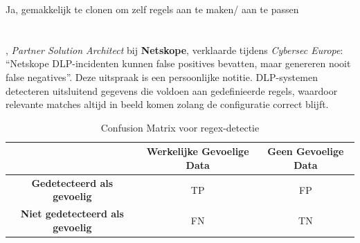 Ja, gemakkelijk te clonen om zelf regels aan te maken/ aan te passen

\section{}
\label{sec:res-eigen-gedefinieerde-dlp-regels}


\subsection{}
\label{sec:functionaliteit-resultaten-eigen}

\subsection{}
\label{sec:correctheid-resultaten-eigen}

\textcite{Quaeyhaegens2025}, \textit{Partner Solution Architect} bij \textbf{Netskope}, verklaarde tijdens \textit{Cybersec Europe}: 
``Netskope DLP-incidenten kunnen false positives bevatten, maar genereren nooit false negatives''. 
Deze uitspraak is een persoonlijke notitie. 
DLP-systemen detecteren uitsluitend gegevens die voldoen aan gedefinieerde regels, waardoor relevante matches altijd in beeld komen zolang de configuratie correct blijft.



\begin{table}[h]
    \centering
    \begin{tabular}{|c|c|c|}
        \hline
        \textbf{} & \textbf{Werkelijke Gevoelige Data} & \textbf{Geen Gevoelige Data} \\ \hline
        \textbf{Gedetecteerd als gevoelig} & TP & FP \\ \hline
        \textbf{Niet gedetecteerd als gevoelig} & FN & TN \\ \hline
    \end{tabular}
    \caption{Confusion Matrix voor regex-detectie}
    \label{tab:confusion_matrix-eigen}
\end{table}

\section{}
\label{sec:performantie-resultaten}


